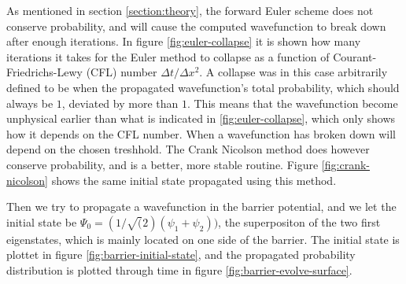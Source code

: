 \documentclass{article}
\begin{document}
As mentioned in section \ref{section:theory}, the forward Euler scheme does not conserve probability, and will cause the computed wavefunction to break down after enough iterations. In figure \ref{fig:euler-collapse} it is shown how many iterations it takes for the Euler method to collapse as a function of Courant-Friedrichs-Lewy (CFL) number $\Delta t/\Delta x^2$. A collapse was in this case arbitrarily defined to be when the propagated wavefunction's total probability, which should always be $1$, deviated by more than $1$. This means that the wavefunction become unphysical earlier than what is indicated in \ref{fig:euler-collapse}, which only shows how it depends on the CFL number. When a wavefunction has broken down will depend on the chosen treshhold. The Crank Nicolson method does however conserve probability, and is a better, more stable routine. Figure \ref{fig:crank-nicolson} shows the same initial state propagated using this method.

Then we try to propagate a wavefunction in the barrier potential, and we let the initial state be $\Psi_0 = (1/\sqrt(2)(\psi_1 + \psi_2))$, the superpositon of the two first eigenstates, which is mainly located on one side of the barrier. The initial state is plottet in figure \ref{fig:barrier-initial-state}, and the propagated probability distribution is plotted through time in figure \ref{fig:barrier-evolve-surface}.
\end{document}
